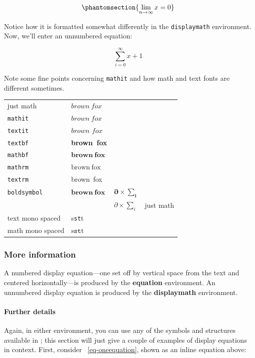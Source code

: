 \begin{equation}\phantomsection{
\lim_{n\rightarrow \infty}x=0
}\label{eq-oneequation}\end{equation}

Notice how it is formatted somewhat differently in the \texttt{displaymath}
environment. Now, we'll enter an unnumbered equation:

\[\sum_{i=0}^{\infty} x + 1\]

Note some fine points concerning \texttt{mathit} and how math and text fonts are
different sometimes.

\begin{center}
  \begin{tabular}[c]{|l|l|l|l|}
    just math & $brown~fox$ \\
    \texttt{mathit} & $\mathit{brown~fox}$ \\
    \texttt{textit} & $\textit{brown~fox}$ \\
    \texttt{textbf}& \textbf{brown~fox} \\
    \texttt{mathbf}& $\mathbf{brown~fox}$ \\
    \texttt{mathrm}& $\mathrm{brown~fox}$ \\
    \texttt{textrm}& \textrm{brown~fox} \\
    \texttt{boldsymbol}& $\boldsymbol{brown~fox}$ &
    $\boldsymbol{\partial\times\sum_i}$\\
              && $\partial\times\sum_i$&just math \\
    text mono spaced& s\texttt{st}t &\\
    math mono spaced& $\mathrm{s}\mathtt{st}\mathrm{t}$&
  \end{tabular}
\end{center}

\subsubsection{More information}

A numbered display equation---one set off by vertical space from the text and
centered horizontally---is produced by the \textbf{equation} environment. An
unnumbered display equation is produced by the \textbf{displaymath} environment.

\paragraph{Further details}

Again, in either environment, you can use any of the symbols and structures
available in \LaTeX@; this section will just give a couple of examples of
display equations in context. First, consider ~\eqref{eq-oneequation}, shown as
an inline equation above:

